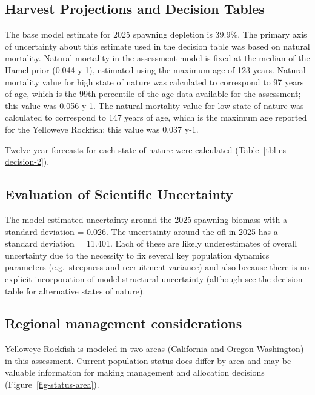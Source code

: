 \documentclass[
]{scrartcl}
\begin{document}
\subsection{Harvest Projections and Decision
Tables}\label{harvest-projections-and-decision-tables}

The base model estimate for 2025 spawning depletion is 39.9\%. The
primary axis of uncertainty about this estimate used in the decision
table was based on natural mortality. Natural mortality in the
assessment model is fixed at the median of the Hamel prior (0.044 y-1),
estimated using the maximum age of 123 years. Natural mortality value
for high state of nature was calculated to correspond to 97 years of
age, which is the 99th percentile of the age data available for the
assessment; this value was 0.056 y-1. The natural mortality value for
low state of nature was calculated to correspond to 147 years of age,
which is the maximum age reported for the Yelloweye Rockfish; this value
was 0.037 y-1.

Twelve-year forecasts for each state of nature were calculated
(Table~\ref{tbl-es-decision-2}).

\subsection{Evaluation of Scientific
Uncertainty}\label{evaluation-of-scientific-uncertainty}

The model estimated uncertainty around the 2025 spawning biomass with a
standard deviation = 0.026. The uncertainty around the \gls{ofl} in 2025
has a standard deviation = 11.401. Each of these are likely
underestimates of overall uncertainty due to the necessity to fix
several key population dynamics parameters (e.g.~steepness and
recruitment variance) and also because there is no explicit
incorporation of model structural uncertainty (although see the decision
table for alternative states of nature).

\subsection{Regional management
considerations}\label{regional-management-considerations}

Yelloweye Rockfish is modeled in two areas (California and
Oregon-Washington) in this assessment. Current population status does
differ by area and may be valuable information for making management and
allocation decisions (Figure~\ref{fig-status-area}).
\end{document}
